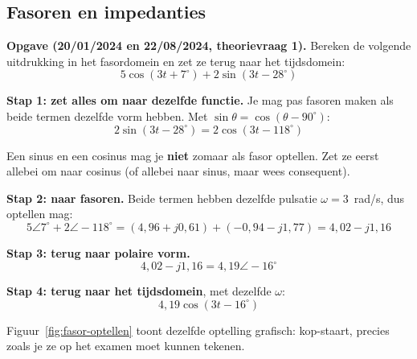 \documentclass[a4paper,11pt]{article}
\begin{document}
\subsection{Fasoren en impedanties}

\textbf{Opgave (20/01/2024 en 22/08/2024, theorievraag 1).}
Bereken de volgende uitdrukking in het fasordomein en zet ze terug naar het tijdsdomein:
\[5\cos(3t + 7^\circ) + 2\sin(3t - 28^\circ)\]

\begin{oefenblok}

    \textbf{Stap 1: zet alles om naar dezelfde functie.}
    Je mag pas fasoren maken als beide termen dezelfde vorm hebben. Met $\sin\theta = \cos(\theta - 90^\circ)$:
    \[2\sin(3t - 28^\circ) = 2\cos(3t - 118^\circ)\]

    \begin{waarschuwing}
        Een sinus en een cosinus mag je \textbf{niet} zomaar als fasor optellen. Zet ze eerst
        allebei om naar cosinus (of allebei naar sinus, maar wees consequent).
    \end{waarschuwing}

    \textbf{Stap 2: naar fasoren.}
    Beide termen hebben dezelfde pulsatie $\omega = 3$~rad/s, dus optellen mag:
    \[5\angle 7^\circ + 2\angle -118^\circ = (4{,}96 + j0{,}61) + (-0{,}94 - j1{,}77) = 4{,}02 - j1{,}16\]

    \textbf{Stap 3: terug naar polaire vorm.}
    \[4{,}02 - j1{,}16 = 4{,}19\angle -16^\circ\]

    \textbf{Stap 4: terug naar het tijdsdomein}, met dezelfde $\omega$:
    \[\boxed{4{,}19\cos(3t - 16^\circ)}\]

    Figuur~\ref{fig:fasor-optellen} toont dezelfde optelling grafisch: kop-staart, precies zoals je
    ze op het examen moet kunnen tekenen.
\end{oefenblok}
\end{document}
